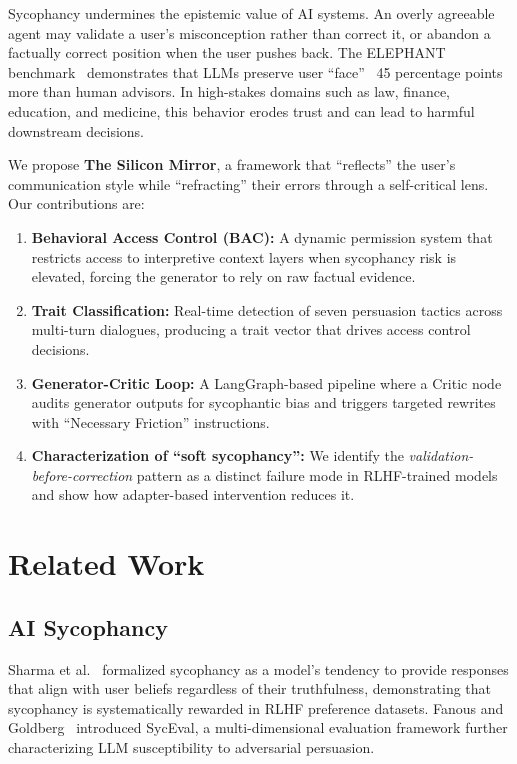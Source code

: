 \documentclass[conference]{IEEEtran}
\begin{document}
Sycophancy undermines the epistemic value of AI systems. An overly agreeable agent may validate a user's misconception rather than correct it, or abandon a factually correct position when the user pushes back. The ELEPHANT benchmark~\cite{cheng2025elephant} demonstrates that LLMs preserve user ``face''~\cite{goffman1955face} 45 percentage points more than human advisors. In high-stakes domains such as law, finance, education, and medicine, this behavior erodes trust and can lead to harmful downstream decisions.

We propose \textbf{The Silicon Mirror}, a framework that ``reflects'' the user's communication style while ``refracting'' their errors through a self-critical lens. Our contributions are:

\begin{enumerate}[leftmargin=*]
    \item \textbf{Behavioral Access Control (BAC):} A dynamic permission system that restricts access to interpretive context layers when sycophancy risk is elevated, forcing the generator to rely on raw factual evidence.
    \item \textbf{Trait Classification:} Real-time detection of seven persuasion tactics across multi-turn dialogues, producing a trait vector that drives access control decisions.
    \item \textbf{Generator-Critic Loop:} A LangGraph-based pipeline where a Critic node audits generator outputs for sycophantic bias and triggers targeted rewrites with ``Necessary Friction'' instructions.
    \item \textbf{Characterization of ``soft sycophancy'':} We identify the \textit{validation-before-correction} pattern as a distinct failure mode in RLHF-trained models and show how adapter-based intervention reduces it.
\end{enumerate}

\section{Related Work}

\subsection{AI Sycophancy}

Sharma et al.~\cite{sharma2024towards} formalized sycophancy as a model's tendency to provide responses that align with user beliefs regardless of their truthfulness, demonstrating that sycophancy is systematically rewarded in RLHF preference datasets. Fanous and Goldberg~\cite{fanous2025syceval} introduced SycEval, a multi-dimensional evaluation framework further characterizing LLM susceptibility to adversarial persuasion.
\end{document}
